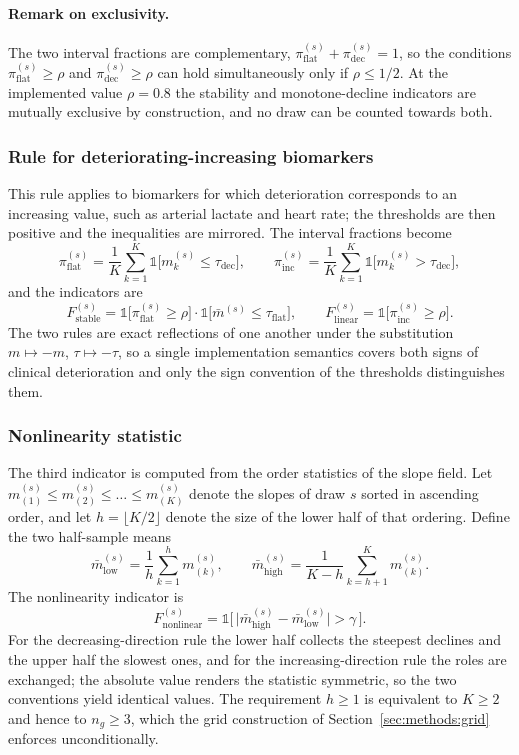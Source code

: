 \paragraph{Remark on exclusivity.} The two interval fractions are complementary, $\pi^{(s)}_{\mathrm{flat}}+\pi^{(s)}_{\mathrm{dec}}=1$, so the conditions $\pi^{(s)}_{\mathrm{flat}}\ge\rho$ and $\pi^{(s)}_{\mathrm{dec}}\ge\rho$ can hold simultaneously only if $\rho\le1/2$. At the implemented value $\rho=0.8$ the stability and monotone-decline indicators are mutually exclusive by construction, and no draw can be counted towards both.

\subsubsection{Rule for deteriorating-increasing biomarkers}

This rule applies to biomarkers for which deterioration corresponds to an increasing value, such as arterial lactate and heart rate; the thresholds are then positive and the inequalities are mirrored. The interval fractions become
$$\pi^{(s)}_{\mathrm{flat}}=\frac{1}{K}\sum_{k=1}^{K}\mathbb{1}\bigl[m^{(s)}_k\le\tau_{\mathrm{dec}}\bigr],\qquad\pi^{(s)}_{\mathrm{inc}}=\frac{1}{K}\sum_{k=1}^{K}\mathbb{1}\bigl[m^{(s)}_k>\tau_{\mathrm{dec}}\bigr],$$
and the indicators are
$$F^{(s)}_{\mathrm{stable}}=\mathbb{1}\bigl[\pi^{(s)}_{\mathrm{flat}}\ge\rho\bigr]\cdot\mathbb{1}\bigl[\bar{m}^{(s)}\le\tau_{\mathrm{flat}}\bigr],\qquad F^{(s)}_{\mathrm{linear}}=\mathbb{1}\bigl[\pi^{(s)}_{\mathrm{inc}}\ge\rho\bigr].$$
The two rules are exact reflections of one another under the substitution $m\mapsto-m$, $\tau\mapsto-\tau$, so a single implementation semantics covers both signs of clinical deterioration and only the sign convention of the thresholds distinguishes them.

\subsubsection{Nonlinearity statistic}

The third indicator is computed from the order statistics of the slope field. Let $m^{(s)}_{(1)}\le m^{(s)}_{(2)}\le\dots\le m^{(s)}_{(K)}$ denote the slopes of draw $s$ sorted in ascending order, and let $h=\lfloor K/2\rfloor$ denote the size of the lower half of that ordering. Define the two half-sample means
$$\bar{m}^{(s)}_{\mathrm{low}}=\frac{1}{h}\sum_{k=1}^{h}m^{(s)}_{(k)},\qquad\bar{m}^{(s)}_{\mathrm{high}}=\frac{1}{K-h}\sum_{k=h+1}^{K}m^{(s)}_{(k)}.$$
The nonlinearity indicator is
$$F^{(s)}_{\mathrm{nonlinear}}=\mathbb{1}\bigl[\,\bigl|\bar{m}^{(s)}_{\mathrm{high}}-\bar{m}^{(s)}_{\mathrm{low}}\bigr|>\gamma\,\bigr].$$
For the decreasing-direction rule the lower half collects the steepest declines and the upper half the slowest ones, and for the increasing-direction rule the roles are exchanged; the absolute value renders the statistic symmetric, so the two conventions yield identical values. The requirement $h\ge1$ is equivalent to $K\ge2$ and hence to $n_g\ge3$, which the grid construction of Section~\ref{sec:methods:grid} enforces unconditionally.

